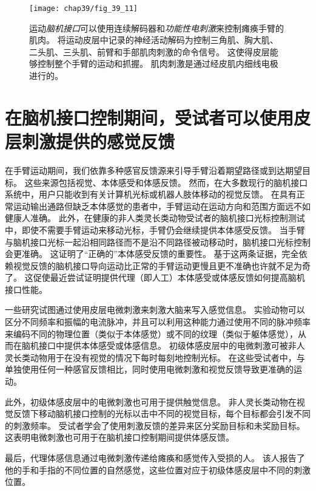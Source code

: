 \begin{figure}[htbp]
	\centering
	\texttt{[image: chap39/fig\_39\_11]}
	\caption{运动\textit{脑机接口}可以使用连续解码器和\textit{功能性电刺激}来控制瘫痪手臂的肌肉。
		将运动皮层中记录的神经活动解码为控制三角肌、胸大肌、二头肌、三头肌、前臂和手部肌肉刺激的命令信号。
		这使得皮层能够控制整个手臂的运动和抓握。
		肌肉刺激是通过经皮肌内细线电极进行的\cite{ajiboye2017restoration}。}
	\label{fig:39_11}
\end{figure}



\section{在脑机接口控制期间，受试者可以使用皮层刺激提供的感觉反馈}

在手臂运动期间，我们依靠多种感官反馈源来引导手臂沿着期望路径或到达期望目标。
这些来源包括视觉、本体感受和体感反馈。
然而，在大多数现行的脑机接口系统中，用户只能收到有关计算机光标或机器人肢体移动的视觉反馈。
在具有正常运动输出通路但缺乏本体感觉的患者中，手臂运动在运动方向和范围方面远不如健康人准确。
此外，在健康的非人类灵长类动物受试者的脑机接口光标控制测试中，即使不需要手臂运动来移动光标，手臂仍会继续提供本体感受反馈。
当手臂与脑机接口光标一起沿相同路径而不是沿不同路径被动移动时，脑机接口光标控制会更准确。
这证明了“正确的”本体感受反馈的重要性。
基于这两条证据，完全依赖视觉反馈的脑机接口导向运动比正常的手臂运动更慢且更不准确也许就不足为奇了。
这促使最近尝试证明提供代理（即人工）本体感受或体感反馈如何提高脑机接口性能。


一些研究试图通过使用皮层电微刺激来刺激大脑来写入感觉信息。
实验动物可以区分不同频率和振幅的电流脉冲，并且可以利用这种能力通过使用不同的脉冲频率来编码不同的物理位置（类似于本体感觉）或不同的纹理（类似于躯体感觉），从而在脑机接口中提供本体感受或体感信息。
初级体感皮层中的电微刺激可被非人灵长类动物用于在没有视觉的情况下每时每刻地控制光标。
在这些受试者中，与单独使用任何一种感官反馈相比，同时使用电微刺激和视觉反馈导致更准确的运动。


此外，初级体感皮层中的电微刺激也可用于提供触觉信息。
非人灵长类动物在视觉反馈下移动脑机接口控制的光标以击中不同的视觉目标，每个目标都会引发不同的刺激频率。 
受试者学会了使用刺激反馈的差异来区分奖励目标和未奖励目标。
这表明电微刺激也可用于在脑机接口控制期间提供体感反馈。


最后，代理体感信息通过电微刺激传递给瘫痪和感觉传入受损的人。
该人报告了他的手和手指的不同位置的自然感觉，这些位置对应于初级体感皮层中不同的刺激位置。



